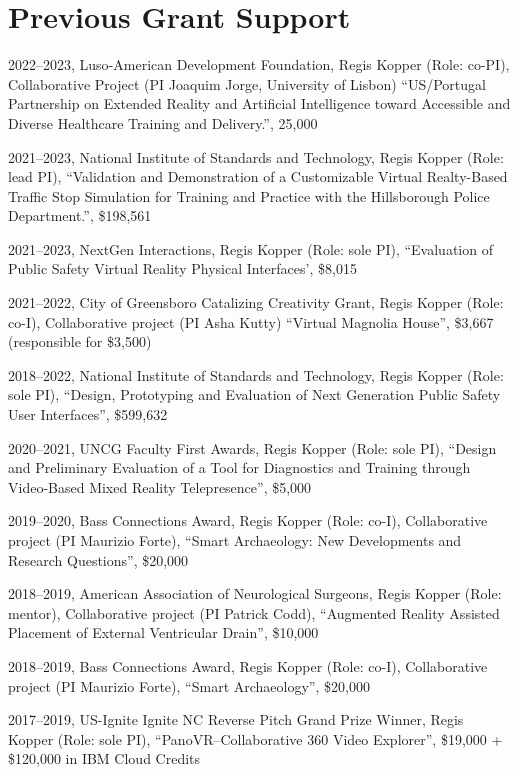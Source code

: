\documentclass[wideaddress]{vitae}
\begin{document}
\section{Previous Grant Support}
\begin{etaremune}
	\item{2022--2023, Luso-American Development Foundation, Regis Kopper (Role: co-PI), Collaborative Project (PI Joaquim Jorge, University of Lisbon) ``US/Portugal Partnership on Extended Reality and Artificial Intelligence toward Accessible and Diverse Healthcare Training and Delivery.'', 25,000~\EURtm}
	\item{2021--2023, National Institute of Standards and Technology, Regis Kopper (Role: lead PI), ``Validation and Demonstration of a Customizable Virtual Realty-Based Traffic Stop Simulation for Training and Practice with the Hillsborough Police Department.'', \$198,561}
	\item{2021--2023, NextGen Interactions, Regis Kopper (Role: sole PI), ``Evaluation of Public Safety Virtual Reality Physical Interfaces', \$8,015}
	\item{2021--2022, City of Greensboro Catalizing Creativity Grant, Regis Kopper (Role: co-I), Collaborative project (PI Asha Kutty) ``Virtual Magnolia House'', \$3,667 (responsible for \$3,500)}
	\item{2018--2022, National Institute of Standards and Technology, Regis Kopper (Role: sole PI), ``Design, Prototyping and Evaluation of Next Generation Public Safety User Interfaces'', \$599,632}
	\item{2020--2021, UNCG Faculty First Awards, Regis Kopper (Role: sole PI), ``Design and Preliminary Evaluation of a Tool for Diagnostics and Training through Video-Based Mixed Reality Telepresence'', \$5,000}
	\item{2019--2020, Bass Connections Award, Regis Kopper (Role: co-I), Collaborative project (PI Maurizio Forte), ``Smart Archaeology: New Developments and Research Questions'', \$20,000}
	\item{2018--2019, American Association of Neurological Surgeons, Regis Kopper (Role: mentor), Collaborative project (PI Patrick Codd), ``Augmented Reality Assisted Placement of External Ventricular Drain'', \$10,000}
	\item{2018--2019, Bass Connections Award, Regis Kopper (Role: co-I), Collaborative project (PI Maurizio Forte), ``Smart Archaeology'', \$20,000}
	\item{2017--2019, US-Ignite Ignite NC Reverse Pitch Grand Prize Winner, Regis Kopper (Role: sole PI), ``PanoVR--Collaborative 360\textdegree{} Video Explorer'', \$19,000 + \$120,000 in IBM Cloud Credits}

\end{etaremune}
\end{document}
